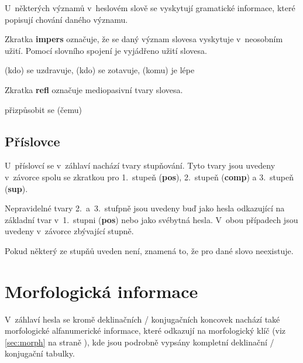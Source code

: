 U~některých významů v~heslovém slově se vyskytují gramatické informace, které popisují chování daného významu.

Zkratka \textbf{impers} označuje, že se daný význam slovesa vyskytuje v~neosobním užití. Pomocí slovního spojení je vyjádřeno užití slovesa.

\blspace
  \dicEntry {}     (kdo) se uzdravuje, (kdo) se zotavuje, (komu) je lépe
\blspace

Zkratka \textbf{refl} označuje mediopasivní tvary slovesa.

\blspace
  \dicEntry {}     {přizpůsobit se (čemu)}
\blspace

\subsection*{Příslovce}

U~příslovcí se v~záhlaví nachází tvary stupňování. Tyto tvary jsou uvedeny v~závorce spolu se zkratkou pro 1.~stupeň (\textbf{pos}), 2.~stupeň (\textbf{comp}) a 3.~stupeň (\textbf{sup}).

\blspace
  \dicEntry {}  
\blspace

Nepravidelné tvary 2.~a~3.~stufpně jsou uvedeny buď jako hesla odkazující na základní tvar v~1.~stupni (\textbf{pos}) nebo jako svébytná hesla. V~obou případech jsou uvedeny v~závorce zbývající stupně.

\blspace
  \dicEntry {}  
\blspace

Pokud některý ze stupňů uveden není, znamená to, že pro dané slovo neexistuje.

\blspace
  \dicEntry {}  
\blspace

\section{Morfologická informace} \label{sec:dec}

V~záhlaví hesla se kromě deklinačních / konjugačních koncovek nachází také morfologické alfanumerické informace, které odkazují na morfologický klíč (viz \ref{sec:morph} na straně \pageref{sec:morph}), kde jsou podrobně vypsány kompletní deklinační / konjugační tabulky.

